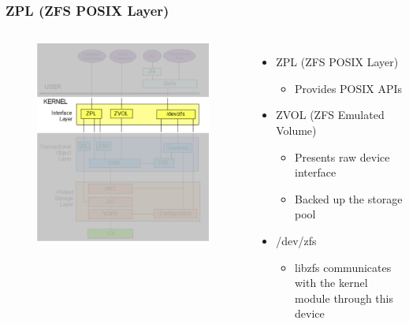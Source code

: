 \begin{frame}[fragile]
    \frametitle{ZPL (ZFS POSIX Layer)}

\begin{columns}[c] %


    \begin{figure}
    \includegraphics[width=0.75\linewidth]{figs/ZFS-zpl.png}
    \end{figure}  


    \begin{itemize}
        \item ZPL (ZFS POSIX Layer)
      \begin{itemize}
          \item Provides POSIX APIs
      \end{itemize}

        \item ZVOL (ZFS Emulated Volume)
      \begin{itemize}
          \item Presents raw device interface
          \item Backed up the storage pool
      \end{itemize}

        \item /dev/zfs
      \begin{itemize}
          \item libzfs communicates with the kernel module through this device
      \end{itemize}

    \end{itemize}

\end{columns}

\end{frame}
